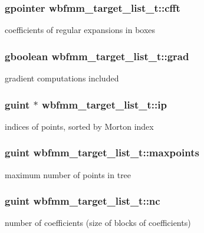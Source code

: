 \subsubsection[{cfft}]{\setlength{\rightskip}{0pt plus 5cm}gpointer wbfmm\+\_\+target\+\_\+list\+\_\+t\+::cfft}\label{structwbfmm__target__list__t_a12bb5b8d5d13858490facfb5ba8c194c}
coefficients of regular expansions in boxes 
\subsubsection[{grad}]{\setlength{\rightskip}{0pt plus 5cm}gboolean wbfmm\+\_\+target\+\_\+list\+\_\+t\+::grad}\label{structwbfmm__target__list__t_ad11d85c28d4ea1a81adf6c53dad621e2}
gradient computations included 
\subsubsection[{ip}]{\setlength{\rightskip}{0pt plus 5cm}guint $\ast$ wbfmm\+\_\+target\+\_\+list\+\_\+t\+::ip}\label{structwbfmm__target__list__t_aaff7d09451a1b24eab1d62df930821e0}
indices of points, sorted by Morton index 
\subsubsection[{maxpoints}]{\setlength{\rightskip}{0pt plus 5cm}guint wbfmm\+\_\+target\+\_\+list\+\_\+t\+::maxpoints}\label{structwbfmm__target__list__t_aaebfaff7dc490dbdbf42a0810573235f}
maximum number of points in tree 
\subsubsection[{nc}]{\setlength{\rightskip}{0pt plus 5cm}guint wbfmm\+\_\+target\+\_\+list\+\_\+t\+::nc}\label{structwbfmm__target__list__t_a036fc44fe30a5e3dd1e76dd82985903f}
number of coefficients (size of blocks of coefficients) 
